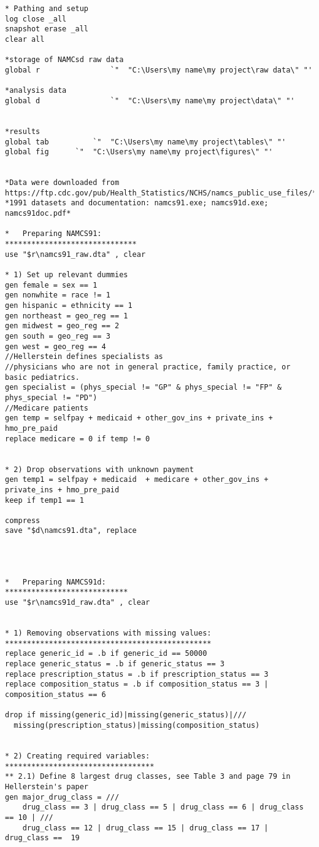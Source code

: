 \documentclass[
]{book}
\begin{document}
\begin{verbatim}
* Pathing and setup
log close _all
snapshot erase _all
clear all

*storage of NAMCsd raw data
global r                `"  "C:\Users\my name\my project\raw data\" "'

*analysis data
global d                `"  "C:\Users\my name\my project\data\" "'


*results
global tab          `"  "C:\Users\my name\my project\tables\" "'
global fig      `"  "C:\Users\my name\my project\figures\" "'


*Data were downloaded from https://ftp.cdc.gov/pub/Health_Statistics/NCHS/namcs_public_use_files/*
*1991 datasets and documentation: namcs91.exe; namcs91d.exe; namcs91doc.pdf*

*   Preparing NAMCS91:
******************************
use "$r\namcs91_raw.dta" , clear

* 1) Set up relevant dummies
gen female = sex == 1
gen nonwhite = race != 1
gen hispanic = ethnicity == 1
gen northeast = geo_reg == 1
gen midwest = geo_reg == 2
gen south = geo_reg == 3
gen west = geo_reg == 4
//Hellerstein defines specialists as 
//physicians who are not in general practice, family practice, or basic pediatrics.
gen specialist = (phys_special != "GP" & phys_special != "FP" & phys_special != "PD") 
//Medicare patients 
gen temp = selfpay + medicaid + other_gov_ins + private_ins + hmo_pre_paid
replace medicare = 0 if temp != 0  


* 2) Drop observations with unknown payment
gen temp1 = selfpay + medicaid  + medicare + other_gov_ins + private_ins + hmo_pre_paid
keep if temp1 == 1

compress
save "$d\namcs91.dta", replace




*   Preparing NAMCS91d:
****************************
use "$r\namcs91d_raw.dta" , clear


* 1) Removing observations with missing values:
***********************************************
replace generic_id = .b if generic_id == 50000
replace generic_status = .b if generic_status == 3
replace prescription_status = .b if prescription_status == 3
replace composition_status = .b if composition_status == 3 | composition_status == 6

drop if missing(generic_id)|missing(generic_status)|///
  missing(prescription_status)|missing(composition_status)

 
* 2) Creating required variables:
**********************************
** 2.1) Define 8 largest drug classes, see Table 3 and page 79 in Hellerstein's paper
gen major_drug_class = ///
    drug_class == 3 | drug_class == 5 | drug_class == 6 | drug_class == 10 | ///
    drug_class == 12 | drug_class == 15 | drug_class == 17 | drug_class ==  19



\end{verbatim}
\end{document}
